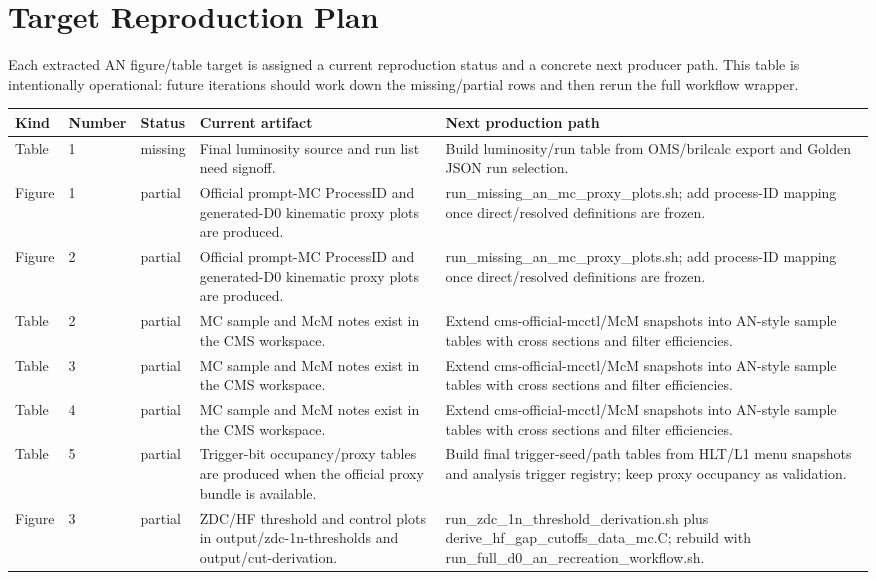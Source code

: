 \documentclass[11pt]{article}
\begin{document}
\section*{Target Reproduction Plan}
Each extracted AN figure/table target is assigned a current reproduction status and a concrete next producer path. This table is intentionally operational: future iterations should work down the missing/partial rows and then rerun the full workflow wrapper.
\begin{longtable}{lll p{} p{}}
\toprule
Kind & Number & Status & Current artifact & Next production path \\
\midrule
\endhead
Table & 1 & missing & Final luminosity source and run list need signoff. & Build luminosity/run table from OMS/brilcalc export and Golden JSON run selection. \\
Figure & 1 & partial & Official prompt-MC ProcessID and generated-D0 kinematic proxy plots are produced. & run\_missing\_an\_mc\_proxy\_plots.sh; add process-ID mapping once direct/resolved definitions are frozen. \\
Figure & 2 & partial & Official prompt-MC ProcessID and generated-D0 kinematic proxy plots are produced. & run\_missing\_an\_mc\_proxy\_plots.sh; add process-ID mapping once direct/resolved definitions are frozen. \\
Table & 2 & partial & MC sample and McM notes exist in the CMS workspace. & Extend cms-official-mcctl/McM snapshots into AN-style sample tables with cross sections and filter efficiencies. \\
Table & 3 & partial & MC sample and McM notes exist in the CMS workspace. & Extend cms-official-mcctl/McM snapshots into AN-style sample tables with cross sections and filter efficiencies. \\
Table & 4 & partial & MC sample and McM notes exist in the CMS workspace. & Extend cms-official-mcctl/McM snapshots into AN-style sample tables with cross sections and filter efficiencies. \\
Table & 5 & partial & Trigger-bit occupancy/proxy tables are produced when the official proxy bundle is available. & Build final trigger-seed/path tables from HLT/L1 menu snapshots and analysis trigger registry; keep proxy occupancy as validation. \\
Figure & 3 & partial & ZDC/HF threshold and control plots in output/zdc-1n-thresholds and output/cut-derivation. & run\_zdc\_1n\_threshold\_derivation.sh plus derive\_hf\_gap\_cutoffs\_data\_mc.C; rebuild with run\_full\_d0\_an\_recreation\_workflow.sh. \\

\end{longtable}
\end{document}
